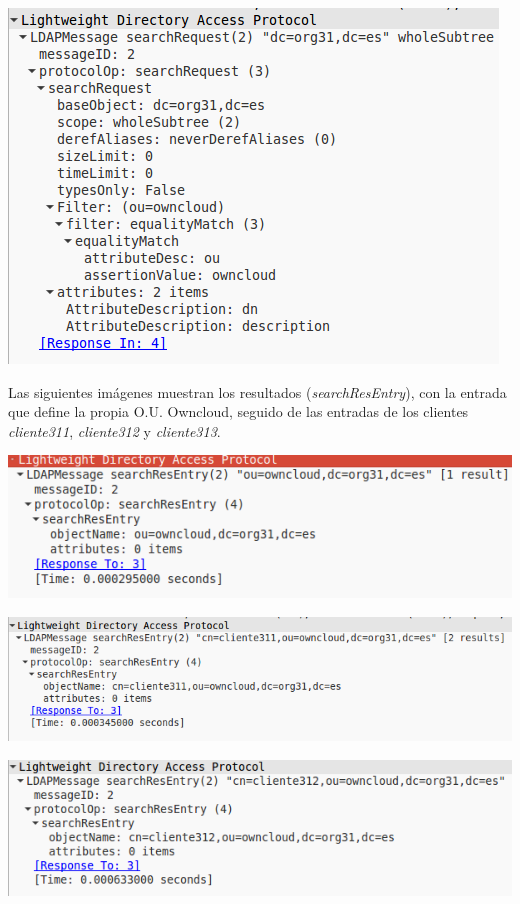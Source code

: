 \documentclass[]{article}
\begin{document}
\begin{center}
	\includegraphics[scale=0.5]{images/ldap/ldap2}
\end{center}

Las siguientes imágenes muestran los resultados (\textit{searchResEntry}), con la entrada que define la propia O.U. Owncloud, seguido de las entradas de los clientes \textit{cliente311}, \textit{cliente312} y \textit{cliente313}.

\begin{center}
	\includegraphics[scale=0.5]{images/ldap/ldap3}
\end{center}
\begin{center}
	\includegraphics[scale=0.5]{images/ldap/ldap4}
\end{center}
\begin{center}
	\includegraphics[scale=0.5]{images/ldap/ldap5}
\end{center}
\end{document}
